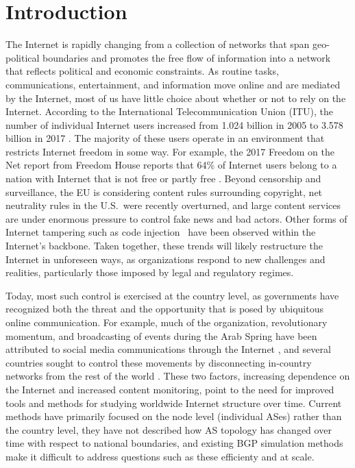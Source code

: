 \section{Introduction}

\par The Internet is rapidly changing from a collection of networks that span geo-political boundaries and promotes the free flow of information into a network that reflects political and economic constraints.
As routine
tasks, communications, entertainment, and information move online and
are mediated by the Internet, most of us have little choice about
whether or not to rely on the Internet.  According to the
International Telecommunication Union (ITU), the number of individual
Internet users increased from 1.024 billion in 2005 to 3.578 billion
in 2017 \cite{itu}. The majority of these users operate in an
environment that restricts Internet freedom in some way. For example,
the 2017 Freedom on the Net report from Freedom House reports that
64\% of Internet users belong to a nation with Internet that is not
free or partly free \cite{FOTN}.  Beyond censorship and surveillance,
the EU is considering content rules surrounding copyright, net
neutrality rules in the U.S.\ were recently overturned, and large
content services are under enormous pressure to control fake news and bad actors. Other forms of Internet
tampering such as code injection~\cite{badtraffic,191996} have been observed within the
Internet's backbone. Taken together, these
trends will likely restructure the Internet in unforeseen ways,
as organizations respond to new challenges and realities, particularly those imposed by legal and regulatory regimes.

Today, most such control is exercised at the country level, as
governments have recognized both the threat and the opportunity that
is posed by ubiquitous online communication. For example, much of the
organization, revolutionary momentum, and broadcasting of events
during the Arab Spring have been attributed to social media
communications through the Internet \cite{arabspring}, and several
countries sought to control these movements by disconnecting
in-country networks from the rest of the world \cite{BGPdisrupt}.
These two factors, increasing dependence on the Internet and increased
content monitoring, point to the need for improved tools and methods
for studying worldwide Internet structure over time.  Current
methods have primarily focused on the node level (individual ASes)
rather than the country level, 
they have not described how AS topology
has changed over time with respect to national boundaries, and
existing BGP simulation methods make it difficult to address 
questions such as these efficienty and at scale.

